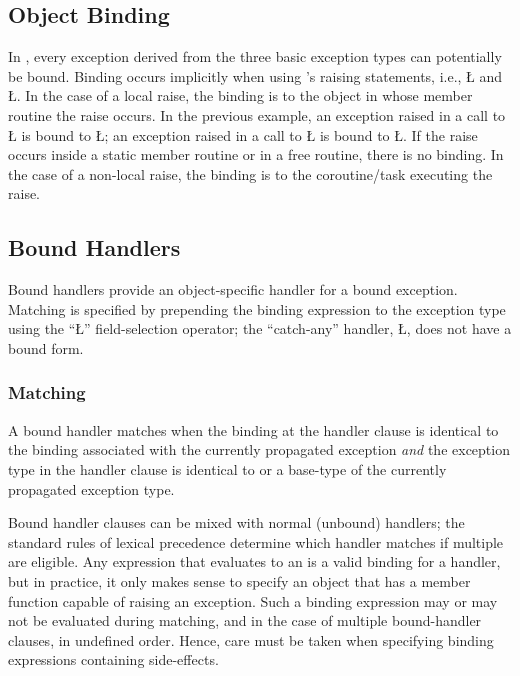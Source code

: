 \documentclass[openright,twoside]{report}
\begin{document}
\subsection{Object Binding}

In \uC, every exception derived from the three basic exception types can potentially be bound.
Binding occurs implicitly when using \uC's raising statements, i.e., \LGinlinetrue\LGbegin\lgrinde\L{}\endlgrinde\LGend{} and \LGinlinetrue\LGbegin\lgrinde\L{}\endlgrinde\LGend{}.
In the case of a local raise, the binding is to the object in whose member routine the raise occurs.
In the previous example, an exception raised in a call to \LGinlinetrue\LGbegin\lgrinde\L{}\endlgrinde\LGend{} is bound to \LGinlinetrue\LGbegin\lgrinde\L{}\endlgrinde\LGend{};
an exception raised in a call to \LGinlinetrue\LGbegin\lgrinde\L{}\endlgrinde\LGend{} is bound to \LGinlinetrue\LGbegin\lgrinde\L{}\endlgrinde\LGend{}.
If the raise occurs inside a static member routine or in a free routine, there is no binding.
In the case of a non-local raise, the binding is to the coroutine/task executing the raise.


\subsection{Bound Handlers}

Bound handlers provide an object-specific handler for a bound exception.
Matching is specified by prepending the binding expression to the exception type using the ``\LGinlinetrue\LGbegin\lgrinde\L{}\endlgrinde\LGend{}'' field-selection operator;
the ``catch-any'' handler, \LGinlinetrue\LGbegin\lgrinde\L{}\endlgrinde\LGend{}, does not have a bound form.


\subsubsection{Matching}

A bound handler matches when the binding at the handler clause is identical to the binding associated with the currently propagated exception \emph{and} the exception type in the handler clause is identical to or a base-type of the currently propagated exception type.

Bound handler clauses can be mixed with normal (unbound) handlers;
the standard rules of lexical precedence determine which handler matches if multiple are eligible.
Any expression that evaluates to an  is a valid binding for a handler, but in practice, it only makes sense to specify an object that has a member function capable of raising an exception.
Such a binding expression may or may not be evaluated during matching, and in the case of multiple bound-handler clauses, in undefined order.
Hence, care must be taken when specifying binding expressions containing side-effects.
\end{document}
